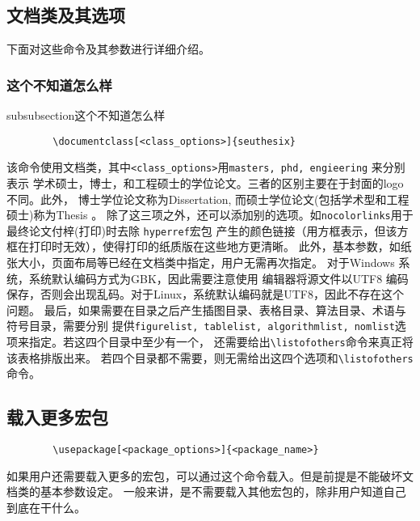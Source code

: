 \documentclass[figurelist,tablelist,algorithmlist,nomlist,masters]{seuthesix}
\begin{document}
	\subsection{文档类及其选项}
	下面对这些命令及其参数进行详细介绍。
	\subsubsection{这个不知道怎么样}
	subsubsection{这个不知道怎么样}
	
	{\color{magenta}
		\begin{verbatim}
		\documentclass[<class_options>]{seuthesix}
		\end{verbatim}
	}
	该命令使用\seuthesix 文档类，其中\verb+<class_options>+用\texttt{masters, phd, engieering} 来分别表示
	学术硕士，博士，和工程硕士的学位论文。三者的区别主要在于封面的logo 不同。此外，
	博士学位论文称为Dissertation, 而硕士学位论文(包括学术型和工程硕士)称为Thesis 。
	除了这三项之外，还可以添加别的选项。如{\texttt{nocolorlinks}}用于最终论文付梓(打印)时去除
	\texttt{hyperref}宏包
	产生的颜色链接（用方框表示，但该方框在打印时无效），使得打印的纸质版在这些地方更清晰。
	此外，基本参数，如纸张大小，页面布局等已经在文档类中指定，用户无需再次指定。
	对于Windows 系统，系统默认编码方式为GBK，因此需要注意使用
	编辑器将源文件以UTF8 编码保存，否则会出现乱码。对于Linux，系统默认编码就是UTF8，因此不存在这个问题。
	最后，如果需要在目录之后产生插图目录、表格目录、算法目录、术语与符号目录，需要分别
	提供\texttt{figurelist, tablelist, algorithmlist, nomlist}选项来指定。若这四个目录中至少有一个，
	还需要给出\verb+\listofothers+命令来真正将该表格排版出来。
	若四个目录都不需要，则无需给出这四个选项和\verb+\listofothers+命令。
	\subsection{载入更多宏包}
	{\color{magenta}
		\begin{verbatim}
		\usepackage[<package_options>]{<package_name>}
		\end{verbatim}
	}
	如果用户还需要载入更多的宏包，可以通过这个命令载入。但是前提是不能破坏\seuthesix 文档类的基本参数设定。
	一般来讲，是不需要载入其他宏包的，除非用户知道自己到底在干什么。
	
\end{document}

